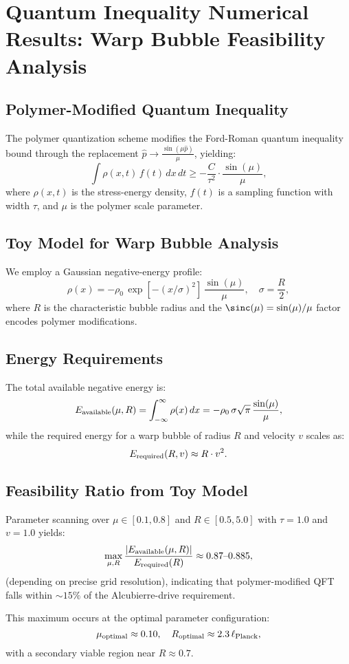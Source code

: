 \documentclass[11pt]{article}
\begin{document}
\section*{Quantum Inequality Numerical Results: Warp Bubble Feasibility Analysis}

\subsection*{Polymer-Modified Quantum Inequality}
The polymer quantization scheme modifies the Ford-Roman quantum inequality bound through the replacement $\hat{p} \rightarrow \frac{\sin(\mu\hat{p})}{\mu}$, yielding:
\[
  \int \rho(x,t)\,f(t)\,dx\,dt \geq -\frac{C}{\tau^2} \cdot \frac{\sin(\mu)}{\mu},
\]
where $\rho(x,t)$ is the stress-energy density, $f(t)$ is a sampling function with width $\tau$, and $\mu$ is the polymer scale parameter.

\subsection*{Toy Model for Warp Bubble Analysis}
We employ a Gaussian negative-energy profile:
\[
  \rho(x) = -\rho_0\,\exp\left[-(x/\sigma)^2\right]\,\frac{\sin(\mu)}{\mu},\quad \sigma=\frac{R}{2},
\]
where $R$ is the characteristic bubble radius and the $\sinc(\mu) = \sin(\mu)/\mu$ factor encodes polymer modifications.

\subsection*{Energy Requirements}
The total available negative energy is:
\[
  E_{\rm available}(\mu,R) = \int_{-\infty}^{\infty} \rho(x)\,dx = -\rho_0\,\sigma\sqrt{\pi}\,\frac{\sin(\mu)}{\mu},
\]
while the required energy for a warp bubble of radius $R$ and velocity $v$ scales as:
\[
  E_{\rm required}(R,v) \approx R \cdot v^2.
\]

\subsection*{Feasibility Ratio from Toy Model}
Parameter scanning over $\mu \in [0.1, 0.8]$ and $R \in [0.5, 5.0]$ with $\tau=1.0$ and $v=1.0$ yields:
\[
  \max_{\mu,R}\frac{|E_{\rm available}(\mu,R)|}{E_{\rm required}(R)} \approx 0.87\text{--}0.885,
\]
(depending on precise grid resolution), indicating that polymer-modified QFT falls within $\sim15\%$ of the Alcubierre-drive requirement.

This maximum occurs at the optimal parameter configuration:
\[
  \mu_{\rm optimal} \approx 0.10,\quad R_{\rm optimal} \approx 2.3\,\ell_{\rm Planck},
\]
with a secondary viable region near $R \approx 0.7$.
\end{document}
